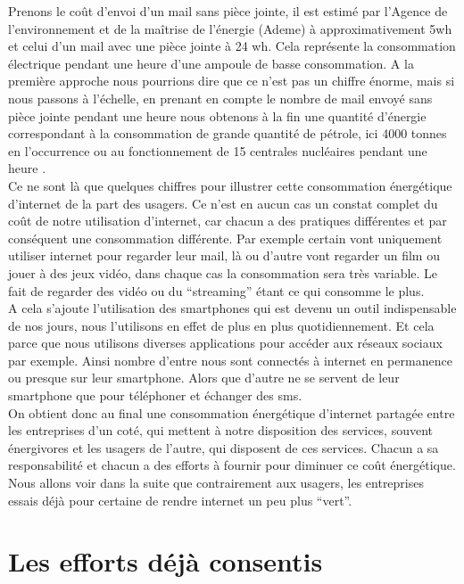 \documentclass[a4paper,twocolumn,12pt]{article}
\begin{document}
	Prenons le coût d'envoi d’un mail sans pièce jointe, il est estimé par l’Agence de l’environnement et de la maîtrise de l’énergie (Ademe) à approximativement 5wh et celui d'un mail avec une pièce jointe à 24 wh. Cela représente la consommation électrique pendant une heure d’une ampoule de basse consommation. A la première approche nous pourrions dire que ce n’est pas un chiffre énorme, mais si nous passons à l'échelle, en prenant en compte le nombre de mail envoyé sans pièce jointe pendant une heure nous obtenons à la fin une quantité d'énergie correspondant à la consommation de grande quantité de pétrole, ici 4000 tonnes en l'occurrence ou au fonctionnement de 15 centrales nucléaires pendant une heure \cite{11}. \\

	Ce ne sont là que quelques chiffres pour illustrer cette consommation énergétique d’internet de la part des usagers. Ce n’est en aucun cas un constat complet du coût de notre utilisation d’internet, car chacun a des pratiques différentes et par conséquent une consommation différente. Par exemple certain vont uniquement utiliser internet pour regarder leur mail, là ou d’autre vont regarder un film ou jouer à des jeux vidéo, dans chaque cas la consommation sera très variable. Le fait de regarder des vidéo ou du “streaming” étant ce qui consomme le plus. \\ 

	A cela s’ajoute l’utilisation des smartphones qui est devenu un outil indispensable de nos jours, nous l'utilisons en effet de plus en plus quotidiennement. Et cela parce que nous utilisons diverses applications pour accéder aux réseaux sociaux par exemple. Ainsi nombre d’entre nous sont connectés à internet en permanence ou presque sur leur smartphone. Alors que d’autre ne se servent de leur smartphone que pour téléphoner et échanger des sms. \\

On obtient donc au final une consommation énergétique d’internet partagée entre les entreprises d’un coté, qui mettent à notre disposition des services, souvent énergivores et les usagers de l’autre, qui disposent de ces services. Chacun a sa responsabilité et chacun a des efforts à fournir pour diminuer ce coût énergétique. Nous allons voir dans la suite que contrairement aux usagers, les entreprises essais déjà pour certaine de rendre internet un peu plus “vert”.

\section{Les efforts déjà consentis}
\end{document}
